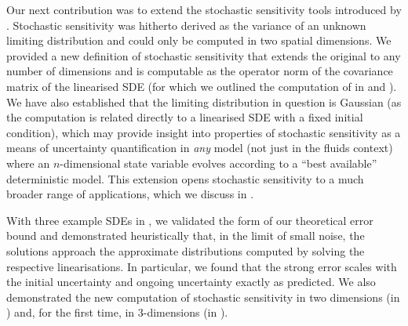 Our next contribution was to extend the stochastic sensitivity tools introduced by \citet{Balasuriya_2020_StochasticSensitivityComputable}.
Stochastic sensitivity was hitherto derived as the variance of an unknown limiting distribution and could only be computed in two spatial dimensions.
We provided a new definition of stochastic sensitivity that extends the original to any number of dimensions and is computable as the operator norm of the covariance matrix of the linearised SDE (for which we outlined the computation of in  and ).
We have also established that the limiting distribution in question is Gaussian (as the computation is related directly to a linearised SDE with a fixed initial condition), which may provide insight into properties of stochastic sensitivity as a means of uncertainty quantification in \emph{any} model (not just in the fluids context) where an \(n\)-dimensional state variable evolves according to a ``best available'' deterministic model.
This extension opens stochastic sensitivity to a much broader range of applications, which we discuss in .

With three example SDEs in , we validated the form of our theoretical error bound and demonstrated heuristically that, in the limit of small noise, the solutions approach the approximate distributions computed by solving the respective linearisations.
In particular, we found that the strong error scales with the initial uncertainty and ongoing uncertainty exactly as predicted.
We also demonstrated the new computation of stochastic sensitivity in two dimensions (in ) and, for the first time, in 3-dimensions (in ).

